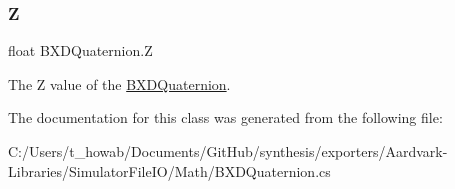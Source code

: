 \mbox{\label{class_b_x_d_quaternion_a8369bbd60061e761662281ad91ec0f6d}} 
\subsubsection{\texorpdfstring{Z}{Z}}
{\footnotesize\ttfamily float B\+X\+D\+Quaternion.\+Z}



The Z value of the \hyperlink{class_b_x_d_quaternion}{B\+X\+D\+Quaternion}. 



The documentation for this class was generated from the following file\+:\begin{DoxyCompactItemize}
\item 
C\+:/\+Users/t\+\_\+howab/\+Documents/\+Git\+Hub/synthesis/exporters/\+Aardvark-\/\+Libraries/\+Simulator\+File\+I\+O/\+Math/B\+X\+D\+Quaternion.\+cs\end{DoxyCompactItemize}

